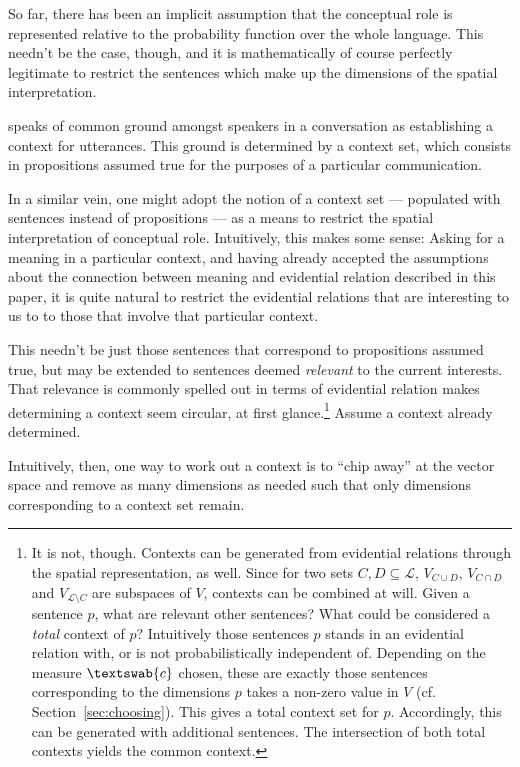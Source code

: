\documentclass[11pt, a4paper]{scrartcl}
\renewcommand{\i}[1]{\emph{#1}}
\renewcommand{\L}{\mathcal{L}}
\newcommand{\m}[1]{\textswab{#1}}
\begin{document}
So far, there has been an implicit assumption that the conceptual role is represented relative to the probability function over the whole language. This needn't be the case, though, and it is mathematically of course perfectly legitimate to restrict the sentences which make up the dimensions of the spatial interpretation. 

\textcite{Stalnaker1978-STAA-2} speaks of common ground amongst speakers in a conversation as establishing a context for utterances. This ground is determined by a context set, which consists in propositions assumed true for the purposes of a particular communication.

In a similar vein, one might adopt the notion of a context set --- populated with sentences instead of propositions --- as a means to restrict the spatial interpretation of conceptual role. Intuitively, this makes some sense: Asking for a meaning in a particular context, and having already accepted the assumptions about the connection between meaning and evidential relation described in this paper, it is quite natural to restrict the evidential relations that are interesting to us to to those that involve that particular context.

This needn't be just those sentences that correspond to propositions assumed true, but may be extended to sentences deemed \i{relevant} to the current interests. That relevance is commonly spelled out in terms of evidential relation makes determining a context seem circular, at first glance.\footnote{It is not, though. Contexts can be generated from evidential relations through the spatial representation, as well. Since for two sets $C, D \subseteq \L$, $V_{C\cup D}$, $V_{C\cap D}$ and $V_{\L\setminus C}$ are subspaces of $V$, contexts can be combined at will. Given a sentence $p$, what are relevant other sentences? What could be considered a \i{total} context of $p$? Intuitively those sentences $p$ stands in an evidential relation with, or is not probabilistically independent of. Depending on the measure $\m{c}$ chosen, these are exactly those sentences corresponding to the dimensions $p$ takes a non-zero value in $V$ (cf. Section~\ref{sec:choosing}). This gives a total context set for $p$. Accordingly, this can be generated with additional sentences. The intersection of both total contexts yields the common context.} Assume a context already determined.

Intuitively, then, one way to work out a context is to ``chip away'' at the vector space and remove as many dimensions as needed such that only dimensions corresponding to a context set remain.
\end{document}
